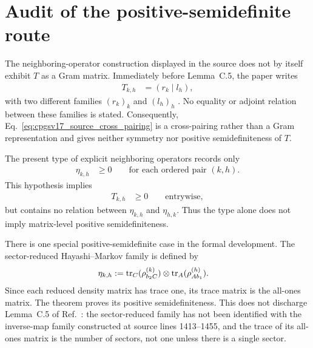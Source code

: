 \documentclass{article}
\begin{document}
\section{Audit of the positive-semidefinite route}
\label{sec:cpgsv17_psd_audit}

The neighboring-operator construction displayed in the source does not by
itself exhibit $T$ as a Gram matrix. Immediately before Lemma~C.5, the paper
writes
\begin{align}
    T_{k,h}
        &= (r_k\mid l_h),
    \label{eq:cpgsv17_source_cross_pairing}
\end{align}
with two different families $(r_k)_k$ and $(l_h)_h$
\cite[Appendix~C.2, lines~1473--1482]{Cirac2016MPDO_arXiv}. No equality or
adjoint relation between these families is stated. Consequently,
Eq.~\ref{eq:cpgsv17_source_cross_pairing} is a cross-pairing rather than a Gram
representation and gives neither symmetry nor positive semidefiniteness of
$T$.

The present type of explicit neighboring operators records only
\begin{align}
    \eta_{k,h}
        &\geq 0
        \qquad\text{for each ordered pair }(k,h).
    \label{eq:cpgsv17_neighboring_operator_positivity}
\end{align}
This hypothesis implies
\begin{align}
    T_{k,h}
        &\geq 0
        \qquad\text{entrywise},
    \label{eq:cpgsv17_trace_matrix_entrywise_nonnegative}
\end{align}
but contains no relation between $\eta_{k,h}$ and $\eta_{h,k}$. Thus the type
alone does not imply matrix-level positive semidefiniteness.

There is one special positive-semidefinite case in the formal development. The
sector-reduced Hayashi--Markov family is defined by
\begin{align}
    \eta_{k,h}
        &:=
        \operatorname{tr}_C(\rho_{b_2C}^{(k)})
        \otimes
        \operatorname{tr}_A(\rho_{Ab_1}^{(h)}).
    \label{eq:cpgsv17_hayashi_markov_neighboring_operator}
\end{align}
Since each reduced density matrix has trace one, its trace matrix is the
all-ones matrix. The theorem
proves its positive semidefiniteness. This does not discharge Lemma~C.5 of
Ref.~\cite{Cirac2016MPDO_arXiv}: the sector-reduced family has not been
identified with the inverse-map family constructed at source lines
1413--1455, and the trace of its all-ones matrix is the number of sectors, not
one unless there is a single sector.
\end{document}
